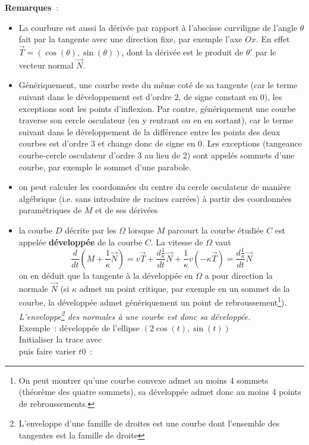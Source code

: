 \documentclass[a4paper,11pt]{book}
\begin{document}
\begin{giacjshere}
{\bf Remarques~}: 
\begin{itemize}
\item La courbure est aussi la d\'eriv\'ee par
rapport \`a l'abscisse curviligne de 
l'angle $\theta$ fait par la
  tangente avec une direction fixe, par exemple l'axe $Ox$.
En effet $\vec{T}=(\cos(\theta),\sin(\theta))$,
dont la d\'eriv\'ee est le produit de $\theta'$ par le vecteur
normal $\vec{N}$.
\item G\'en\'eriquement, une courbe reste du m\^eme cot\'e de
sa tangente (car le terme suivant dans le d\'eveloppement est d'ordre
2, de signe constant en 0), les exceptions sont les points
d'inflexion. Par contre,
g\'en\'eriquement une courbe traverse son cercle osculateur (en y
rentrant ou en en sortant), car le terme suivant dans le
d\'eveloppement de la diff\'erence entre les points des deux courbes 
est d'ordre 3 et change donc de signe en 0. Les exceptions
(tangeance courbe-cercle osculateur d'ordre 3 au lieu de 2)
sont appel\'es sommets d'une courbe, par exemple le sommet d'une
parabole.
\item on peut calculer les coordonn\'ees du centre du cercle
osculateur de mani\`ere alg\'ebrique (i.e. sans introduire de racines
carr\'ees) \`a partir des
coordonn\'ees param\'etriques de $M$ et de ses d\'eriv\'ees
\item la courbe $D$ d\'ecrite par les $\Omega$ lorsque $M$ parcourt
la courbe \'etudi\'ee $C$ est appel\'ee
{\bf d\'evelopp\'ee} 
de la courbe $C$. 
La vitesse de $\Omega$ vaut
$$ \frac{d}{dt}(M+\frac1\kappa \vec{N})=v\vec{T} +
\frac{d\frac1\kappa}{dt} \vec{N} + \frac1\kappa v(-\kappa
\vec{T})
= \frac{d\frac1\kappa}{dt} \vec{N} $$
on en d\'eduit que la tangente \`a la d\'evelopp\'ee en $\Omega$ a
pour direction la normale $\vec{N}$  (si $\kappa$ admet un
point critique, par exemple en un sommet de la courbe,
la d\'evelopp\'ee admet g\'en\'eriquement
un point de rebroussement\footnote{On peut montrer qu'une courbe
convexe admet au moins 4 sommets (th\'eor\`eme des quatre sommets), 
sa d\'evelopp\'ee admet donc
au moins 4 points de rebroussements.}). 
{\em L'enveloppe\footnote{L'enveloppe d'une famille
de droites est une courbe dont l'ensemble des tangentes est la famille de droite} 
des normales \`a une courbe est donc sa d\'evelopp\'ee.}\\
Exemple~: d\'evelopp\'ee de l'ellipse $(2\cos(t),\sin(t))$\\
Initialiser la trace avec \\
puis faire varier $t0$~:

\end{itemize}
\end{giacjshere}
\end{document}
